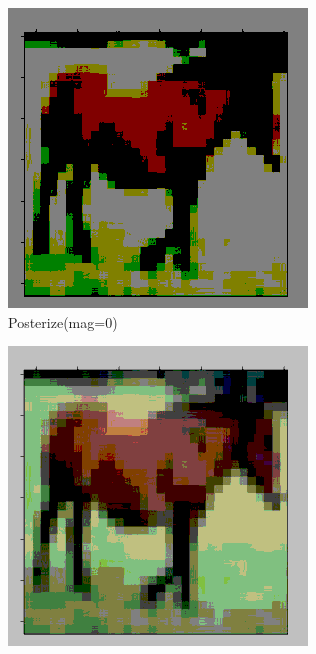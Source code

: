 \documentclass[onecolumn]{ujarticle}   %
\begin{document}
\begin{figure}[h]
      \begin{subfigure}{0.3\columnwidth}
        \centering
        \includegraphics[width=1.0\columnwidth]{transform_test/Posterize_0.png}
        \caption{Posterize(mag=0)}
        \label{fig:Posterize_0}
      \end{subfigure}
      \begin{subfigure}{0.3\columnwidth}
        \centering
        \includegraphics[width=1.0\columnwidth]{transform_test/Posterize_15.png}

\end{subfigure}
\end{figure}
\end{document}
